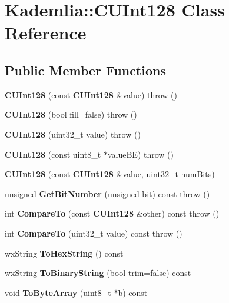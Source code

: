 \section{Kademlia::CUInt128 Class Reference}
\label{classKademlia_1_1CUInt128}
\subsection*{Public Member Functions}
\begin{DoxyCompactItemize}
\item 
{\bfseries CUInt128} (const {\bf CUInt128} \&value)  throw ()\label{classKademlia_1_1CUInt128_afa0f196aa71e02f8677d79ff7f6d72a1}

\item 
{\bfseries CUInt128} (bool fill=false)  throw ()\label{classKademlia_1_1CUInt128_af673b7a4d62e01a5d558b45b16b8844b}

\item 
{\bfseries CUInt128} (uint32\_\-t value)  throw ()\label{classKademlia_1_1CUInt128_af65064e0de42cc7dae2f60a4563f92d5}

\item 
{\bfseries CUInt128} (const uint8\_\-t $\ast$valueBE)  throw ()\label{classKademlia_1_1CUInt128_af313d5c3bdbc57cb071cad4dac148778}

\item 
{\bf CUInt128} (const {\bf CUInt128} \&value, uint32\_\-t numBits)
\item 
unsigned {\bf GetBitNumber} (unsigned bit) const   throw ()
\item 
int {\bfseries CompareTo} (const {\bf CUInt128} \&other) const   throw ()\label{classKademlia_1_1CUInt128_a1556d8c45e870ba19ee68126f26838c1}

\item 
int {\bfseries CompareTo} (uint32\_\-t value) const   throw ()\label{classKademlia_1_1CUInt128_a579044ae861fc61d7b99d2ab146a8137}

\item 
wxString {\bfseries ToHexString} () const \label{classKademlia_1_1CUInt128_a8e9fd37f7ce54102e6a9830867cd071c}

\item 
wxString {\bfseries ToBinaryString} (bool trim=false) const \label{classKademlia_1_1CUInt128_ab03c7901e2a5fb2dfbf3ac20f50863e3}

\item 
void {\bfseries ToByteArray} (uint8\_\-t $\ast$b) const \label{classKademlia_1_1CUInt128_a648556e8280ec9601cfd048fd5beba05}


\end{DoxyCompactItemize}
